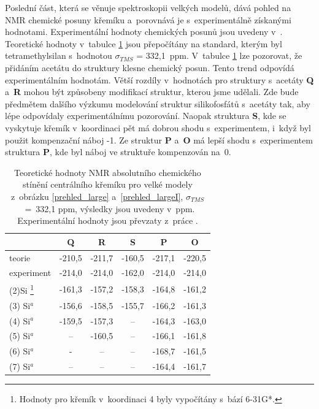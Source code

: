 \documentclass[
digital, %
table,   %
nolof,     %
nolot,     %
oneside,
]{fithesis3}
\begin{document}
Poslední část, která se věnuje spektroskopii velkých modelů, dává pohled na NMR chemické posuny křemíku a~porovnává je s~experimentálně získanými hodnotami. Experimentální hodnoty chemických posunů jsou uvedeny v~\cite{rtg_4_pinkas}. Teoretické hodnoty v~tabulce \ref{nmr} jsou přepočítány na standard, kterým byl tetramethylsilan s~hodnotou $\sigma_{TMS}$ = 332,1~ppm. V~tabulce \ref{nmr} lze pozorovat, že přidáním acetátu do struktury klesne chemický posun. Tento trend odpovídá experimentálním hodnotám. Větší rozdíly v~hodnotách pro struktury s~acetáty  \textbf{Q} a~\textbf{R} mohou být způsobeny modifikací struktur, kterou jsme udělali. Zde bude předmětem dalšího výzkumu modelování struktur silikofosfátů s~acetáty tak, aby lépe odpovídaly experimentálnímu pozorování. Naopak struktura  \textbf{S}, kde se vyskytuje křemík v~koordinaci pět má dobrou shodu s~experimentem, i~když byl použit kompenzační náboj -1. Ze struktur \textbf{P} a~\textbf{O} má lepší shodu s~experimentem struktura \textbf{P}, kde byl náboj ve struktuře kompenzován na~0.

\begin{table}[H]
\begin{minipage}{\textwidth}
\caption{Teoretické hodnoty NMR absolutního chemického stínění centrálního křemíku pro velké modely z~obrázku \ref{prehled_large} a~\ref{prehled_largeI}, $\sigma_{TMS}$~=~332,1 ppm, výsledky jsou uvedeny v~ppm. Experimentální hodnoty jsou převzaty z~práce \cite{rtg_4_pinkas}.}
\begin{center}
\begin{tabular}{|l|c|c|c|c|c|}
\hline
\label{nmr} & \textbf{Q} & \textbf{R} &\textbf{S} & \textbf{P} & \textbf{O}  \\ \hline
teorie & -210,5 & -211,7 & \multicolumn{1}{r|}{-160,5} & -217,1 & -220,5 \\ \hline
experiment & -214,0 & -214,0 & -162,0 & -214,0 & -214,0 \\ \hline \hline
(2)Si \footnote{Hodnoty pro křemík v~koordinaci 4 byly vypočítány s~bází 6-31G*.} & -161,3 & -157,2 & -158,3& -164,8 & -161,2 \\ \hline
(3) Si$^a$ & -156,6 & -158,5 & -155,7 & -166,2 & -161,3 \\ \hline
(4) Si$^a$ & -159,5 & -157,3 & -- & -164,3 & -163,0 \\ \hline
(5) Si$^a$ & -- & -160,5 & -- & -166,1 & -161,8 \\ \hline
(6) Si$^a$ &- & -- & -- & -168,7 & -161,5 \\ \hline
(7) Si$^a$ & -- & -- & -- & -164,4 & -161,7 \\ \hline
\end{tabular}\end{center}\end{minipage}\end{table}
\end{document}
